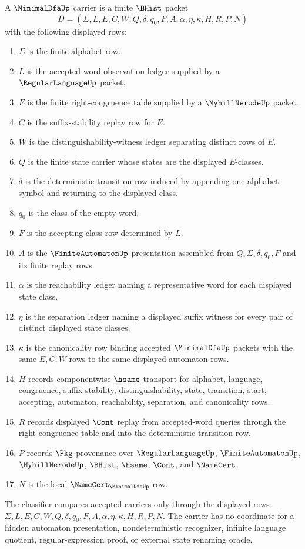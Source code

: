 \begin{definition}
\label{def:minimal-dfa-carrier}
A $\MinimalDfaUp$ carrier is a finite $\BHist$ packet
$$
D=(\Sigma,L,E,C,W,Q,\delta,q_0,F,A,\alpha,\eta,\kappa,H,R,P,N)
$$
with the following displayed rows:
\begin{enumerate}
\item $\Sigma$ is the finite alphabet row.
\item $L$ is the accepted-word observation ledger supplied by a $\RegularLanguageUp$ packet.
\item $E$ is the finite right-congruence table supplied by a $\MyhillNerodeUp$ packet.
\item $C$ is the suffix-stability replay row for $E$.
\item $W$ is the distinguishability-witness ledger separating distinct rows of $E$.
\item $Q$ is the finite state carrier whose states are the displayed $E$-classes.
\item $\delta$ is the deterministic transition row induced by appending one alphabet symbol and returning to the displayed class.
\item $q_0$ is the class of the empty word.
\item $F$ is the accepting-class row determined by $L$.
\item $A$ is the $\FiniteAutomatonUp$ presentation assembled from $Q,\Sigma,\delta,q_0,F$ and its finite replay rows.
\item $\alpha$ is the reachability ledger naming a representative word for each displayed state class.
\item $\eta$ is the separation ledger naming a displayed suffix witness for every pair of distinct displayed state classes.
\item $\kappa$ is the canonicality row binding accepted $\MinimalDfaUp$ packets with the same $E,C,W$ rows to the same displayed automaton rows.
\item $H$ records componentwise $\hsame$ transport for alphabet, language, congruence, suffix-stability, distinguishability, state, transition, start, accepting, automaton, reachability, separation, and canonicality rows.
\item $R$ records displayed $\Cont$ replay from accepted-word queries through the right-congruence table and into the deterministic transition row.
\item $P$ records $\Pkg$ provenance over $\RegularLanguageUp$, $\FiniteAutomatonUp$, $\MyhillNerodeUp$, $\BHist$, $\hsame$, $\Cont$, and $\NameCert$.
\item $N$ is the local $\NameCert_{\MinimalDfaUp}$ row.
\end{enumerate}
The classifier compares accepted carriers only through the displayed rows $\Sigma,L,E,C,W,Q,\delta,q_0,F,A,\alpha,\eta,\kappa,H,R,P,N$. The carrier has no coordinate for a hidden automaton presentation, nondeterministic recognizer, infinite language quotient, regular-expression proof, or external state renaming oracle.
\end{definition}

